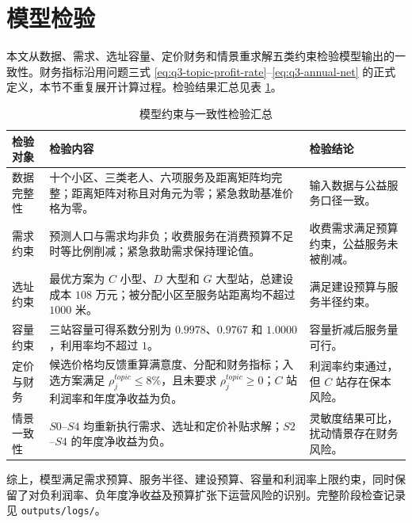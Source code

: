\section{模型检验}

本文从数据、需求、选址容量、定价财务和情景重求解五类约束检验模型输出的一致性。财务指标沿用问题三式 \eqref{eq:q3-topic-profit-rate}--\eqref{eq:q3-annual-net} 的正式定义，本节不重复展开计算过程。检验结果汇总见表 \ref{tab:model-validation-summary}。

\begin{table}[H]
  \centering
  \caption{模型约束与一致性检验汇总}
  \label{tab:model-validation-summary}
  \small
  \renewcommand{\arraystretch}{1.18}
  \begin{tabular}{p{}p{}p{}}
    \toprule
    检验对象 & 检验内容 & 检验结论 \\
    \midrule
    数据完整性 &
    十个小区、三类老人、六项服务及距离矩阵均完整；距离矩阵对称且对角元为零；紧急救助基准价格为零。 &
    输入数据与公益服务口径一致。 \\
    需求约束 &
    预测人口与需求均非负；收费服务在消费预算不足时等比例削减；紧急救助需求保持理论值。 &
    收费需求满足预算约束，公益服务未被削减。 \\
    选址约束 &
    最优方案为 $C$ 小型、$D$ 大型和 $G$ 大型站，总建设成本 $108$ 万元；被分配小区至服务站距离均不超过 $1000$ 米。 &
    满足建设预算与服务半径约束。 \\
    容量约束 &
    三站容量可得系数分别为 $0.9978$、$0.9767$ 和 $1.0000$，利用率均不超过 $1$。 &
    容量折减后服务量可行。 \\
    定价与财务 &
    候选价格均反馈重算满意度、分配和财务指标；入选方案满足 $\rho_j^{topic}\leq 8\%$，且未要求 $\rho_j^{topic}\geq0$；$C$ 站利润率和年度净收益为负。 &
    利润率约束通过，但 $C$ 站存在保本风险。 \\
    情景一致性 &
    $S0$--$S4$ 均重新执行需求、选址和定价补贴求解；$S2$--$S4$ 的年度净收益为负。 &
    灵敏度结果可比，扰动情景存在财务风险。 \\
    \bottomrule
  \end{tabular}
\end{table}

综上，模型满足需求预算、服务半径、建设预算、容量和利润率上限约束，同时保留了对负利润率、负年度净收益及预算扩张下运营风险的识别。完整阶段检查记录见 \texttt{outputs/logs/}。
